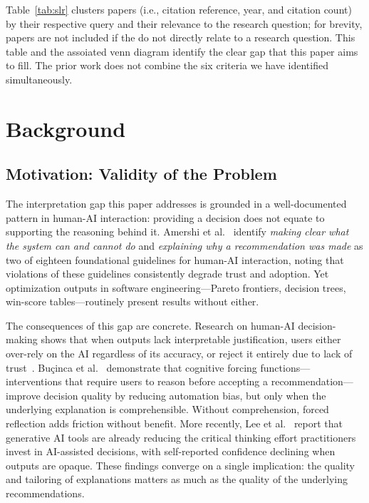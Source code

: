 \documentclass[sigconf,review]{acmart}
\begin{document}


Table~\ref{tab:slr} clusters papers (i.e., citation reference, year, and citation count) by their respective query and their relevance to the research question; for brevity, papers are not included if the do not directly relate to a research question. This table and the assoiated venn diagram identify the clear gap that this paper aims to fill. The prior work does not combine the six criteria we have identified simultaneously. 


\section{Background}
\label{sec:background}

\subsection{Motivation: Validity of the Problem}
\label{subsec:motivation}

The interpretation gap this paper addresses is grounded in a well-documented
pattern in human-AI interaction: providing a decision does not equate to
supporting the reasoning behind it. Amershi et al.~\cite{HAI_interaction}
identify \textit{making clear what the system can and cannot do} and
\textit{explaining why a recommendation was made} as two of eighteen
foundational guidelines for human-AI interaction, noting that violations of
these guidelines consistently degrade trust and adoption. Yet optimization
outputs in software engineering---Pareto frontiers, decision trees, win-score
tables---routinely present results without either.

The consequences of this gap are concrete. Research on human-AI
decision-making shows that when outputs lack interpretable justification,
users either over-rely on the AI regardless of its accuracy, or reject it
entirely due to lack of trust~\cite{trust_or_think, de2016almost}.
Bu\c{c}inca et al.~\cite{trust_or_think} demonstrate that cognitive forcing
functions---interventions that require users to reason before accepting a
recommendation---improve decision quality by reducing automation bias, but
only when the underlying explanation is comprehensible. Without comprehension,
forced reflection adds friction without benefit. More recently, Lee et
al.~\cite{lee2025impact} report that generative AI tools are already reducing
the critical thinking effort practitioners invest in AI-assisted decisions,
with self-reported confidence declining when outputs are opaque. These findings
converge on a single implication: the quality and tailoring of explanations
matters as much as the quality of the underlying recommendations.
\end{document}
